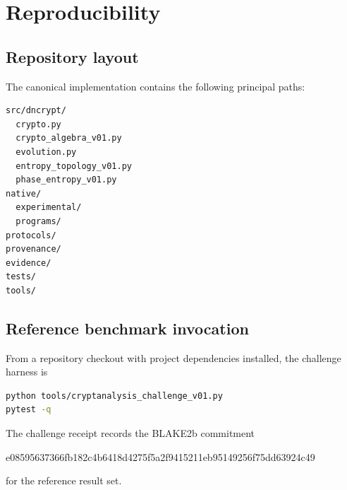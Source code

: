 \chapter{Reproducibility}
\section{Repository layout}
The canonical implementation contains the following principal paths:
\begin{lstlisting}
src/dncrypt/
  crypto.py
  crypto_algebra_v01.py
  evolution.py
  entropy_topology_v01.py
  phase_entropy_v01.py
native/
  experimental/
  programs/
protocols/
provenance/
evidence/
tests/
tools/
\end{lstlisting}

\section{Reference benchmark invocation}
From a repository checkout with project dependencies installed, the challenge harness is
\begin{lstlisting}[language=bash]
python tools/cryptanalysis_challenge_v01.py
pytest -q
\end{lstlisting}
The challenge receipt records the BLAKE2b commitment
\begin{center}
\ttfamily\small e08595637366fb182c4b6418d4275f5a2f9415211eb95149256f75dd63924c49
\end{center}
for the reference result set.
